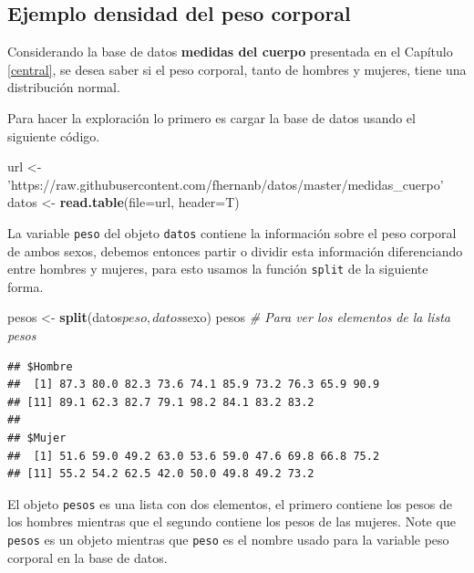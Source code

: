 \documentclass[10pt,]{krantz}
\makeatletter
\newenvironment{Shaded}{\begin{snugshade}}{\end{snugshade}}
\newcommand{\KeywordTok}[1]{\textcolor[rgb]{0.13,0.29,0.53}{\textbf{{#1}}}}
\newcommand{\DataTypeTok}[1]{\textcolor[rgb]{0.13,0.29,0.53}{{#1}}}
\newcommand{\StringTok}[1]{\textcolor[rgb]{0.31,0.60,0.02}{{#1}}}
\newcommand{\CommentTok}[1]{\textcolor[rgb]{0.56,0.35,0.01}{\textit{{#1}}}}
\newcommand{\NormalTok}[1]{{#1}}
\newenvironment{kframe}{%
\medskip{}
\setlength{\fboxsep}{.8em}
 \def\at@end@of@kframe{}%
 \ifinner\ifhmode%
  \def\at@end@of@kframe{\end{minipage}}%
  \begin{minipage}{\columnwidth}%
 \fi\fi%
 \def\FrameCommand##1{\hskip\@totalleftmargin \hskip-\fboxsep
 \colorbox{shadecolor}{##1}\hskip-\fboxsep
     \hskip-\linewidth \hskip-\@totalleftmargin \hskip\columnwidth}%
 \MakeFramed {\advance\hsize-\width
   \@totalleftmargin\z@ \linewidth\hsize
   \@setminipage}}%
 {\par\unskip\endMakeFramed%
 \at@end@of@kframe}
\renewenvironment{Shaded}{\begin{kframe}}{\end{kframe}}
\makeatother
\begin{document}
\subsection*{Ejemplo densidad del peso
corporal}\label{ejemplo-densidad-del-peso-corporal}


Considerando la base de datos \textbf{medidas del cuerpo} presentada en
el Capítulo \ref{central}, se desea saber si el peso corporal, tanto de
hombres y mujeres, tiene una distribución normal.

Para hacer la exploración lo primero es cargar la base de datos usando
el siguiente código.

\begin{Shaded}
\begin{Highlighting}[]
\NormalTok{url <-}\StringTok{ 'https://raw.githubusercontent.com/fhernanb/datos/master/medidas_cuerpo'}
\NormalTok{datos <-}\StringTok{ }\KeywordTok{read.table}\NormalTok{(}\DataTypeTok{file=}\NormalTok{url, }\DataTypeTok{header=}\NormalTok{T)}
\end{Highlighting}
\end{Shaded}

La variable \texttt{peso} del objeto \texttt{datos} contiene la
información sobre el peso corporal de ambos sexos, debemos entonces
partir o dividir esta información diferenciando entre hombres y mujeres,
para esto usamos la función \texttt{split} de la siguiente forma.

\begin{Shaded}
\begin{Highlighting}[]
\NormalTok{pesos <-}\StringTok{ }\KeywordTok{split}\NormalTok{(datos$peso, datos$sexo)}
\NormalTok{pesos  }\CommentTok{# Para ver los elementos de la lista pesos}
\end{Highlighting}
\end{Shaded}

\begin{verbatim}
## $Hombre
##  [1] 87.3 80.0 82.3 73.6 74.1 85.9 73.2 76.3 65.9 90.9
## [11] 89.1 62.3 82.7 79.1 98.2 84.1 83.2 83.2
## 
## $Mujer
##  [1] 51.6 59.0 49.2 63.0 53.6 59.0 47.6 69.8 66.8 75.2
## [11] 55.2 54.2 62.5 42.0 50.0 49.8 49.2 73.2
\end{verbatim}

El objeto \texttt{pesos} es una lista con dos elementos, el primero
contiene los pesos de los hombres mientras que el segundo contiene los
pesos de las mujeres. Note que \texttt{pesos} es un objeto mientras que
\texttt{peso} es el nombre usado para la variable peso corporal en la
base de datos.
\end{document}
